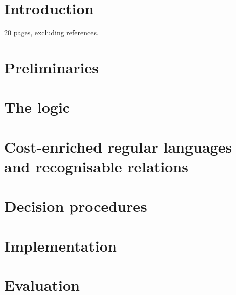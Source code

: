 \documentclass{llncs}
\begin{document}
\section{Introduction}

20 pages, excluding references.



\section{Preliminaries}




\section{The logic \slint}




\section{Cost-enriched regular languages and recognisable relations}




\section{Decision procedures}




\section{Implementation}




\section{Evaluation}
\end{document}

